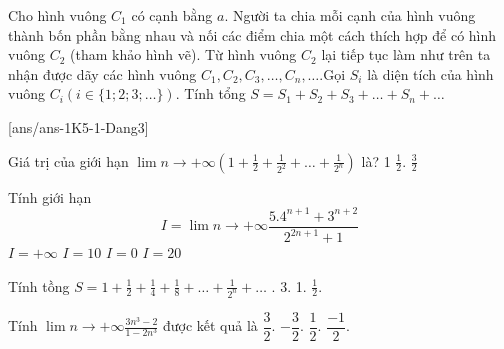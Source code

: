 \begin{bt}%
	Cho hình vuông $C_1$ có cạnh bằng $a$. Người ta chia mỗi cạnh của hình vuông thành bốn phần bằng nhau và nối các điểm chia một cách thích hợp để có hình vuông $C_2$ (tham khảo hình vẽ).
	Từ hình vuông $C_2$ lại tiếp tục làm như trên ta nhận được dãy các hình vuông $C_1, C_2, C_3, \ldots, C_n, \ldots$.Gọi $S_i$ là diện tích của hình vuông $C_i(i \in\{1 ; 2 ; 3 ; \ldots\})$. Tính tổng $S=S_1+S_2+S_3+\ldots+S_n+\ldots$
\end{bt} 
\centerline{}
[ans/ans-1K5-1-Dang3]
\begin{ex}%
	Giá trị của giới hạn $\lim \limits{n \to +\infty}\left(1+\frac{1}{2}+\frac{1}{2^2}+\ldots+\frac{1}{2^n}\right)$ là?
\choice
{1}
{} 
{$\frac{1}{2}$.}
{$\frac{3}{2}$}
\end{ex}
\begin{ex}%
	Tính giới hạn
	$$	I=\lim \limits{n \to +\infty}\frac{5.4^{n+1}+3^{n+2}}{2^{2 n+1}+1}$$
\choice
{$I=+\infty$}
{\True $I=10$}
{$I=0$}
{$I=20$}
\end{ex}

\begin{ex}%
	Tính tồng $S=1+\frac{1}{2}+\frac{1}{4}+\frac{1}{8}+\ldots+\frac{1}{2^n}+\ldots$
\choice
{.}
{3.}
{1.}
{$\frac{1}{2}$.}
\end{ex}
\begin{ex}%
	Tính $\lim \limits{n \to +\infty}\frac{3 n^3-2}{1-2 n^3}$ được kết quả là
\choice
{$\dfrac{3}{2}$.}
{\True $-\dfrac{3}{2}$.}
{$\dfrac{1}{2}$.}
{$\dfrac{-1}{2}$.}
\end{ex}

